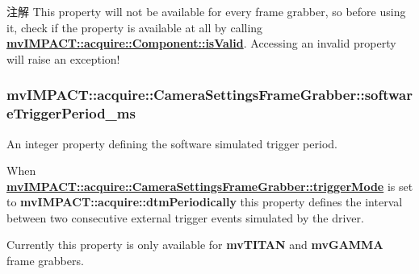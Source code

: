 \begin{DoxyNote}{注解}
This property will not be available for every frame grabber, so before using it, check if the property is available at all by calling {\bfseries \hyperlink{classmv_i_m_p_a_c_t_1_1acquire_1_1_component_ac51e55e7e046101f3c6119d84123abd5}{mv\+I\+M\+P\+A\+C\+T\+::acquire\+::\+Component\+::is\+Valid}}. Accessing an invalid property will raise an exception! 
\end{DoxyNote}
\hypertarget{classmv_i_m_p_a_c_t_1_1acquire_1_1_camera_settings_frame_grabber_a91d1b7187120dee62c0daf60ec53dc41}{
\subsubsection[{software\+Trigger\+Period\+\_\+ms}]{ mv\+I\+M\+P\+A\+C\+T\+::acquire\+::\+Camera\+Settings\+Frame\+Grabber\+::software\+Trigger\+Period\+\_\+ms}}\label{classmv_i_m_p_a_c_t_1_1acquire_1_1_camera_settings_frame_grabber_a91d1b7187120dee62c0daf60ec53dc41}


An integer property defining the software simulated trigger period. 

When {\bfseries \hyperlink{classmv_i_m_p_a_c_t_1_1acquire_1_1_camera_settings_frame_grabber_a6bb960b80203a48a68ac20917ebd5e3f}{mv\+I\+M\+P\+A\+C\+T\+::acquire\+::\+Camera\+Settings\+Frame\+Grabber\+::trigger\+Mode}} is set to {\bfseries mv\+I\+M\+P\+A\+C\+T\+::acquire\+::dtm\+Periodically} this property defines the interval between two consecutive external trigger events simulated by the driver.

Currently this property is only available for {\bfseries mv\+T\+I\+T\+A\+N} and {\bfseries mv\+G\+A\+M\+M\+A} frame grabbers.

